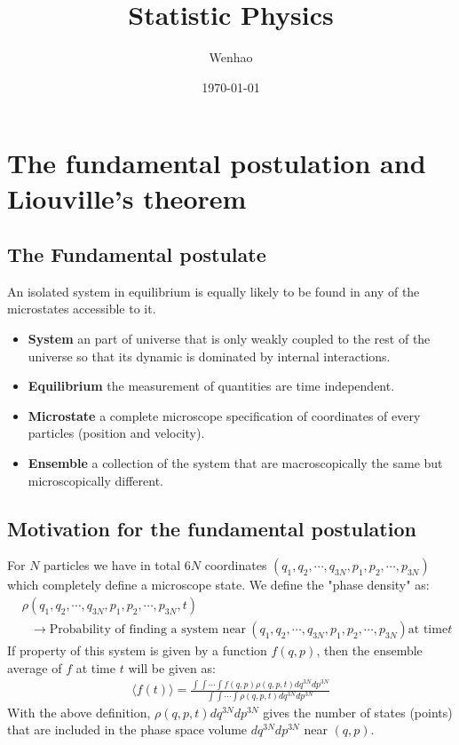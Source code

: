 \documentclass{article}
\begin{document}
\title{Statistic Physics}
\author{Wenhao}
\date{\today}
\maketitle

\section{The fundamental postulation and Liouville's theorem}

\subsection{The Fundamental postulate}
An isolated system in equilibrium is equally likely to be found in any
of the microstates accessible to it.

\begin{itemize}
    \item \textbf{System} an part of universe that is only weakly coupled to the rest of the universe 
    so that its dynamic is dominated by internal interactions.
    \item \textbf{Equilibrium} the measurement of quantities are time independent.
    \item \textbf{Microstate} a complete microscope specification of coordinates of every particles (position and velocity).
    \item \textbf{Ensemble} a collection of the system that are macroscopically the same but microscopically different. 
\end{itemize}

\subsection{Motivation for the fundamental postulation}
For $N$ particles we have in total $6N$ coordinates $(q_1, q_2, \cdots , q_{3N}, p_1, p_2, \cdots , p_{3N})$ which completely
define a microscope state. We define the "phase density" as:
\begin{align}
    &\rho(q_1, q_2, \cdots , q_{3N}, p_1, p_2, \cdots , p_{3N}, t) \\
     &\ \ \   \to \text{Probability of finding a system near}\ (q_1, q_2, \cdots , q_{3N}, p_1, p_2, \cdots , p_{3N}) \text{at time} t
\end{align}
If property of this system is given by a function $f(q,p)$, then the ensemble average of $f$ at time $t$ will be 
given as:
\begin{align}
    \langle f(t) \rangle = \frac{\int\int\cdots\int f(q,p)\rho(q,p,t)dq^{3N}dp^{3N}}{\int\int\cdots\int \rho(q,p,t)dq^{3N}dp^{3N}}
\end{align}
With the above definition, $\rho(q,p,t)dq^{3N}dp^{3N}$ gives the number of states (points) that are included in the phase space 
volume $dq^{3N}dp^{3N}$ near $(q,p)$.
\end{document}
